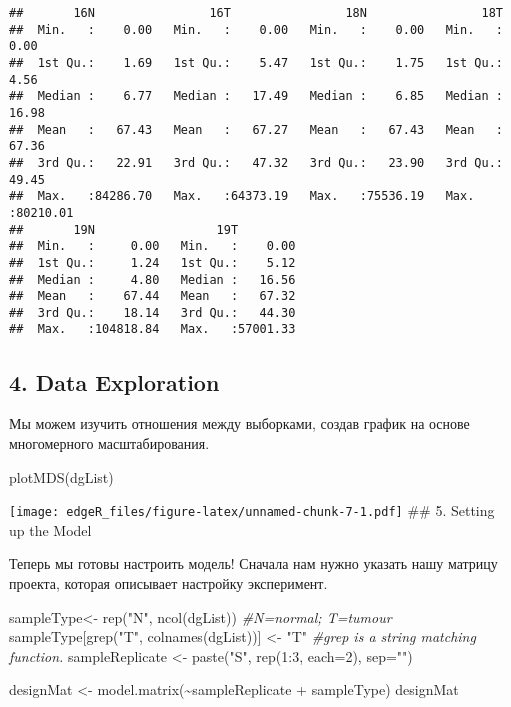 \documentclass[
]{article}
\newenvironment{Shaded}{\begin{snugshade}}{\end{snugshade}}
\newcommand{\AttributeTok}[1]{\textcolor[rgb]{0.77,0.63,0.00}{#1}}
\newcommand{\CommentTok}[1]{\textcolor[rgb]{0.56,0.35,0.01}{\textit{#1}}}
\newcommand{\DecValTok}[1]{\textcolor[rgb]{0.00,0.00,0.81}{#1}}
\newcommand{\FunctionTok}[1]{\textcolor[rgb]{0.00,0.00,0.00}{#1}}
\newcommand{\NormalTok}[1]{#1}
\newcommand{\OtherTok}[1]{\textcolor[rgb]{0.56,0.35,0.01}{#1}}
\newcommand{\SpecialCharTok}[1]{\textcolor[rgb]{0.00,0.00,0.00}{#1}}
\newcommand{\StringTok}[1]{\textcolor[rgb]{0.31,0.60,0.02}{#1}}
\begin{document}
\begin{verbatim}
##       16N                16T                18N                18T          
##  Min.   :    0.00   Min.   :    0.00   Min.   :    0.00   Min.   :    0.00  
##  1st Qu.:    1.69   1st Qu.:    5.47   1st Qu.:    1.75   1st Qu.:    4.56  
##  Median :    6.77   Median :   17.49   Median :    6.85   Median :   16.98  
##  Mean   :   67.43   Mean   :   67.27   Mean   :   67.43   Mean   :   67.36  
##  3rd Qu.:   22.91   3rd Qu.:   47.32   3rd Qu.:   23.90   3rd Qu.:   49.45  
##  Max.   :84286.70   Max.   :64373.19   Max.   :75536.19   Max.   :80210.01  
##       19N                 19T          
##  Min.   :     0.00   Min.   :    0.00  
##  1st Qu.:     1.24   1st Qu.:    5.12  
##  Median :     4.80   Median :   16.56  
##  Mean   :    67.44   Mean   :   67.32  
##  3rd Qu.:    18.14   3rd Qu.:   44.30  
##  Max.   :104818.84   Max.   :57001.33
\end{verbatim}

\hypertarget{data-exploration}{%
\subsection{4. Data Exploration}\label{data-exploration}}

Мы можем изучить отношения между выборками, создав график на основе
многомерного масштабирования.

\begin{Shaded}
\begin{Highlighting}[]
\FunctionTok{plotMDS}\NormalTok{(dgList)}
\end{Highlighting}
\end{Shaded}

\texttt{[image: edgeR\_files/figure-latex/unnamed-chunk-7-1.pdf]} \#\# 5.
Setting up the Model

Теперь мы готовы настроить модель! Сначала нам нужно указать нашу
матрицу проекта, которая описывает настройку эксперимент.

\begin{Shaded}
\begin{Highlighting}[]
\NormalTok{sampleType}\OtherTok{\textless{}{-}} \FunctionTok{rep}\NormalTok{(}\StringTok{"N"}\NormalTok{, }\FunctionTok{ncol}\NormalTok{(dgList)) }\CommentTok{\#N=normal; T=tumour}
\NormalTok{sampleType[}\FunctionTok{grep}\NormalTok{(}\StringTok{"T"}\NormalTok{, }\FunctionTok{colnames}\NormalTok{(dgList))] }\OtherTok{\textless{}{-}} \StringTok{"T"}
\CommentTok{\#\textquotesingle{}grep\textquotesingle{} is a string matching function.}
\NormalTok{sampleReplicate }\OtherTok{\textless{}{-}} \FunctionTok{paste}\NormalTok{(}\StringTok{"S"}\NormalTok{, }\FunctionTok{rep}\NormalTok{(}\DecValTok{1}\SpecialCharTok{:}\DecValTok{3}\NormalTok{, }\AttributeTok{each=}\DecValTok{2}\NormalTok{), }\AttributeTok{sep=}\StringTok{""}\NormalTok{)}

\NormalTok{designMat }\OtherTok{\textless{}{-}} \FunctionTok{model.matrix}\NormalTok{(}\SpecialCharTok{\textasciitilde{}}\NormalTok{sampleReplicate }\SpecialCharTok{+}\NormalTok{ sampleType)}
\NormalTok{designMat}
\end{Highlighting}
\end{Shaded}
\end{document}
